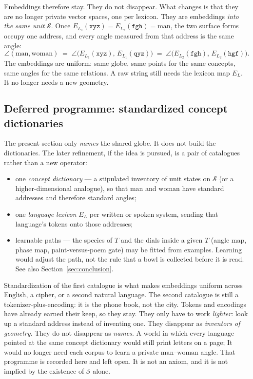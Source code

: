 \documentclass[12pt, a4paper]{article}
\begin{document}
Embeddings therefore stay. They do not disappear.
What changes is that they are no longer private vector spaces, one
per lexicon. They are embeddings \emph{into the same unit}
$\mathcal{S}$. Once $E_{L_1}(\texttt{xyz})=E_{L_2}(\texttt{fgh})=\mathrm{man}$,
the two surface forms occupy one address, and every angle measured
from that address is the same angle:
\begin{equation}
    \angle(\mathrm{man},\mathrm{woman})
    \;=\;
    \angle\bigl(E_{L_1}(\texttt{xyz}),\,E_{L_1}(\texttt{qyz})\bigr)
    \;=\;
    \angle\bigl(E_{L_2}(\texttt{fgh}),\,E_{L_2}(\texttt{hgf})\bigr).
    \label{eq:uniform_angles}
\end{equation}
The embeddings are uniform: same globe, same points for the same
concepts, same angles for the same relations. A raw string still
needs the lexicon map $E_L$. It no longer needs a new geometry.

\subsection{Deferred programme: standardized concept dictionaries}
\label{subsec:standard_dictionaries}
The present section only \emph{names} the shared globe. It does not
build the dictionaries. The later refinement, if the idea is pursued,
is a pair of catalogues rather than a new operator:
\begin{itemize}
    \item one \emph{concept dictionary} --- a stipulated inventory of
          unit states on $\mathcal{S}$ (or a higher-dimensional
          analogue), so that $\mathrm{man}$ and $\mathrm{woman}$ have
          standard addresses and therefore standard angles;
    \item one \emph{language lexicon} $E_L$ per written or spoken
          system, sending that language's tokens onto those addresses;
    \item learnable paths --- the species of $T$ and the dials inside
          a given $T$ (angle map, phase map, paint-versus-poem gate)
          may be fitted from examples. Learning would adjust the path,
          not the rule that a bowl is collected before it is read.
          See also Section~\ref{sec:conclusion}.
\end{itemize}
Standardization of the first catalogue is what makes embeddings
uniform across English, a cipher, or a second natural language.
The second catalogue is still a tokenizer-plus-encoding: it is the
phone book, not the city. Tokens and encodings have already earned
their keep, so they stay. They only have to work \emph{lighter}:
look up a standard address instead of inventing one. They disappear as
\emph{inventors of geometry}. They do not disappear as \emph{names}.
A world in which every language pointed at the same concept
dictionary would still print letters on a page; It would no longer need each 
corpus to learn a private $\mathrm{man}$--$\mathrm{woman}$ angle. 
That programme is recorded here and left open. It is not an
axiom, and it is not implied by the existence of $\mathcal{S}$ alone.
\end{document}
